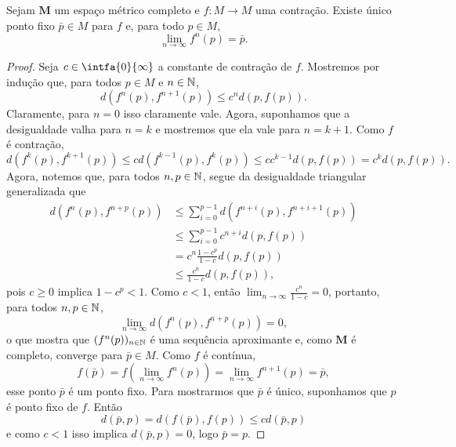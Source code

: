 \begin{prop}
Sejam $\bm M$ um espaço métrico completo e $f\colon M \to M$ uma contração. Existe único ponto fixo $\bar p \in M$ para $f$ e, para todo $p \in M$,
	\begin{equation*}
	\lim_{n \to \infty} f^n(p) = \bar p.
	\end{equation*}
\end{prop}
\begin{proof}
Seja $c \in \intfa{0}{\infty}$ a constante de contração de $f$. Mostremos por indução que, para todos $p \in M$ e $n \in \mathbb{N}$,
	\begin{equation*}
	d(f^n(p),f^{n+1}(p)) \leq c^n d(p,f(p)).
	\end{equation*}
Claramente, para $n=0$ isso claramente vale. Agora, suponhamos que a desigualdade valha para $n=k$ e mostremos que ela vale para $n=k+1$. Como $f$ é contração,
	\begin{equation*}
	d(f^k(p),f^{k+1}(p)) \leq c d(f^{k-1}(p),f^k(p)) \leq c c^{k-1} d(p,f(p)) = c^k d(p,f(p)).
	\end{equation*}
Agora, notemos que, para todos $n,p \in \mathbb{N}$, segue da desigualdade triangular generalizada que
	\begin{align*}
	d(f^n(p),f^{n+p}(p)) &\leq \sum_{i=0}^{p-1} d(f^{n+i}(p),f^{n+i+1}(p)) \\
		&\leq \sum_{i=0}^{p-1} c^{n+i} d(p,f(p)) \\
		&= c^n\frac{1-c^p}{1-c} d(p,f(p)) \\
		&\leq \frac{c^n}{1-c} d(p,f(p)),
	\end{align*}
pois $c\geq 0$ implica $1-c^p<1$. Como $c<1$, então $\lim_{n \to \infty} \frac{c^n}{1-c} = 0$, portanto, para todos $n,p \in \mathbb{N}$,
	\begin{equation*}
	\lim_{n \to \infty} d(f^n(p),f^{n+p}(p)) = 0,
	\end{equation*}
o que mostra que $(f^n(p))_{n \in \mathbb{N}}$ é uma sequência aproximante e, como $\bm M$ é completo, converge para $\bar p \in M$. Como $f$ é contínua,
	\begin{equation*}
	f(\bar p) = f\left(\lim_{n \to \infty} f^n(p)\right) = \lim_{n \to \infty} f^{n+1}(p) = \bar p,
	\end{equation*}
esse ponto $\bar p$ é um ponto fixo. Para mostrarmos que $\bar p$ é único, suponhamos que $p$ é ponto fixo de $f$. Então
	\begin{equation*}
	d(\bar p,p) = d(f(\bar p),f(p)) \leq c d(\bar p,p)
	\end{equation*}
e como $c<1$ isso implica $d(\bar p,p)=0$, logo $\bar p=p$.
\end{proof}

